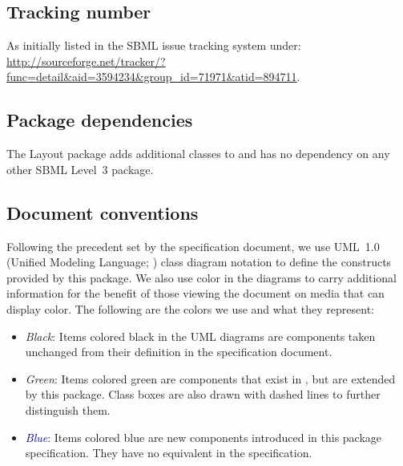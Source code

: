 \subsection{Tracking number}
As initially listed in the SBML issue tracking system under: \\
\url{http://sourceforge.net/tracker/?func=detail&aid=3594234&group_id=71971&atid=894711}.

\subsection{Package dependencies}

The Layout package adds additional classes to \sbmlthreecore and has no dependency on any other SBML Level~3 package.


\subsection{Document conventions}

\label{conventions}

Following the precedent set by the \sbmlthreecore specification
document, we use UML~1.0 (Unified Modeling Language;
\citealt{eriksson:1998,oestereich:1999}) class diagram notation to
define the constructs provided by this package.  We also use color in
the diagrams to carry additional information for the benefit of those
viewing the document on media that can display color.  The following are
the colors we use and what they represent:

\begin{itemize}

\item[\raisebox{2.75pt}{\colorbox{black}{\rule{0.8pt}{0.8pt}}}]
  \emph{Black}: Items colored black in the UML diagrams are components
  taken unchanged from their definition in the \sbmlthreecore
  specification document.

\item[\raisebox{2.75pt}{\colorbox{mediumgreen}{\rule{0.8pt}{0.8pt}}}]
  \emph{\textcolor{mediumgreen}{Green}}: Items colored green are
  components that exist in \sbmlthreecore, but are extended by this
  package.  Class boxes are also drawn with dashed lines to further
  distinguish them.

\item[\raisebox{2.75pt}{\colorbox{darkblue}{\rule{0.8pt}{0.8pt}}}]
  \emph{\textcolor{darkblue}{Blue}}: Items colored blue are new
  components introduced in this package specification.  They have no
  equivalent in the \sbmlthreecore specification.

\end{itemize}

